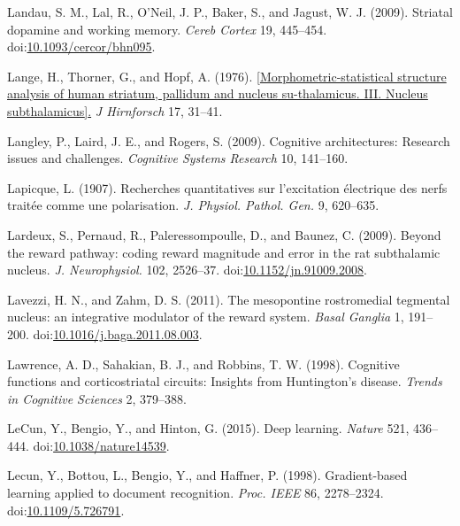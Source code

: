 \documentclass[
  11pt,
  a4paper,
]{scrbook}
\newlength{\cslhangindent}
\newenvironment{CSLReferences}[2] %
 {\begin{list}{}{%
  \setlength{\itemindent}{0pt}
  \setlength{\leftmargin}{0pt}
  \setlength{\parsep}{0pt}
  \ifodd #1
   \setlength{\leftmargin}{\cslhangindent}
   \setlength{\itemindent}{-1\cslhangindent}
  \fi
  \setlength{\itemsep}{#2\baselineskip}}}
 {\end{list}}
\begin{document}
\begin{CSLReferences}{1}{1}
Landau, S. M., Lal, R., O'Neil, J. P., Baker, S., and Jagust, W. J.
(2009). Striatal dopamine and working memory. \emph{Cereb Cortex} 19,
445--454.
doi:\href{https://doi.org/10.1093/cercor/bhn095}{10.1093/cercor/bhn095}.

Lange, H., Thorner, G., and Hopf, A. (1976).
\href{https://www.ncbi.nlm.nih.gov/pubmed/965719}{{[}Morphometric-statistical
structure analysis of human striatum, pallidum and nucleus
su-thalamicus. III. Nucleus subthalamicus{]}.} \emph{J Hirnforsch} 17,
31--41.

Langley, P., Laird, J. E., and Rogers, S. (2009). Cognitive
architectures: Research issues and challenges. \emph{Cognitive Systems
Research} 10, 141--160.

Lapicque, L. (1907). Recherches quantitatives sur l'excitation
électrique des nerfs traitée comme une polarisation. \emph{J. Physiol.
Pathol. Gen.} 9, 620--635.

Lardeux, S., Pernaud, R., Paleressompoulle, D., and Baunez, C. (2009).
{Beyond the reward pathway: coding reward magnitude and error in the rat
subthalamic nucleus.} \emph{J. Neurophysiol.} 102, 2526--37.
doi:\href{https://doi.org/10.1152/jn.91009.2008}{10.1152/jn.91009.2008}.

Lavezzi, H. N., and Zahm, D. S. (2011). {The mesopontine rostromedial
tegmental nucleus: an integrative modulator of the reward system.}
\emph{Basal Ganglia} 1, 191--200.
doi:\href{https://doi.org/10.1016/j.baga.2011.08.003}{10.1016/j.baga.2011.08.003}.

Lawrence, A. D., Sahakian, B. J., and Robbins, T. W. (1998). Cognitive
functions and corticostriatal circuits: Insights from {Huntington's}
disease. \emph{Trends in Cognitive Sciences} 2, 379--388.

LeCun, Y., Bengio, Y., and Hinton, G. (2015). Deep learning.
\emph{Nature} 521, 436--444.
doi:\href{https://doi.org/10.1038/nature14539}{10.1038/nature14539}.

Lecun, Y., Bottou, L., Bengio, Y., and Haffner, P. (1998).
{Gradient-based learning applied to document recognition}. \emph{Proc.
IEEE} 86, 2278--2324.
doi:\href{https://doi.org/10.1109/5.726791}{10.1109/5.726791}.


\end{CSLReferences}
\end{document}
